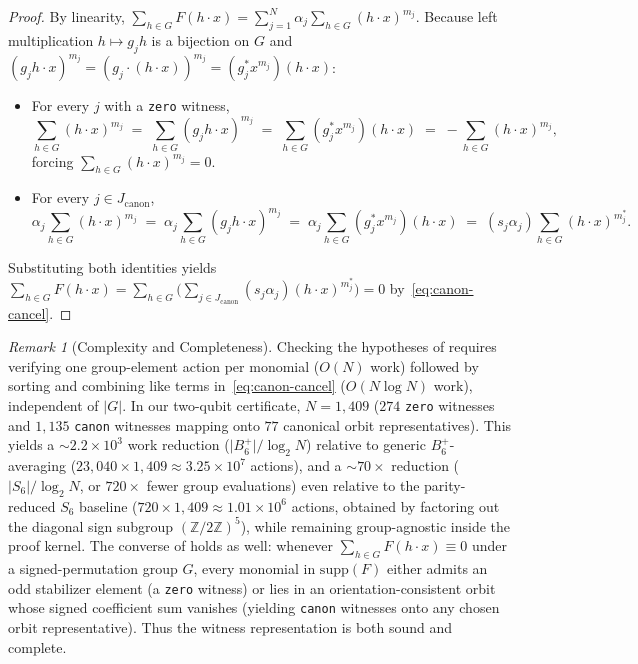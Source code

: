 \documentclass[11pt,a4paper]{article}
\theoremstyle{plain}
\theoremstyle{definition}
\theoremstyle{remark}
\newtheorem{remark}[theorem]{Remark}
\newcommand{\Z}{\mathbb{Z}}
\newcommand{\Bplus}{B_6^+}
\newcommand{\code}[1]{\texttt{\small #1}}
\begin{document}
\begin{proof}
By linearity, $\sum_{h\in G} F(h\cdot x) = \sum_{j=1}^N \alpha_j \sum_{h\in G} (h\cdot x)^{m_j}$. Because left multiplication $h \mapsto g_j h$ is a bijection on $G$ and $(g_j h \cdot x)^{m_j} = (g_j \cdot (h\cdot x))^{m_j} = (g_j^* x^{m_j})(h\cdot x)$:
\begin{itemize}[leftmargin=1.8em, itemsep=2pt]
  \item For every $j$ with a \code{zero} witness,
  \[
    \sum_{h\in G} (h\cdot x)^{m_j}
    \;=\; \sum_{h\in G} (g_j h \cdot x)^{m_j}
    \;=\; \sum_{h\in G} (g_j^* x^{m_j})(h\cdot x)
    \;=\; -\sum_{h\in G} (h\cdot x)^{m_j},
  \]
  forcing $\sum_{h\in G} (h\cdot x)^{m_j} = 0$.
  \item For every $j \in J_{\mathrm{canon}}$,
  \[
    \alpha_j \sum_{h\in G} (h\cdot x)^{m_j}
    \;=\; \alpha_j \sum_{h\in G} (g_j h \cdot x)^{m_j}
    \;=\; \alpha_j \sum_{h\in G} (g_j^* x^{m_j})(h\cdot x)
    \;=\; (s_j \alpha_j) \sum_{h\in G} (h\cdot x)^{m_j^*}.
  \]
\end{itemize}
Substituting both identities yields $\sum_{h\in G} F(h\cdot x) = \sum_{h\in G} \bigl(\sum_{j\in J_{\mathrm{canon}}} (s_j \alpha_j)(h\cdot x)^{m_j^*}\bigr) = 0$ by~\eqref{eq:canon-cancel}.
\end{proof}

\begin{remark}[Complexity and Completeness]
Checking the hypotheses of  requires verifying one group-element action per monomial ($O(N)$ work) followed by sorting and combining like terms in~\eqref{eq:canon-cancel} ($O(N\log N)$ work), independent of $\lvert G\rvert$. In our two-qubit certificate, $N = 1{,}409$ ($274$ \code{zero} witnesses and $1{,}135$ \code{canon} witnesses mapping onto $77$ canonical orbit representatives). This yields a $\sim 2.2\times 10^3$ work reduction ($\lvert\Bplus\rvert/\log_2 N$) relative to generic $\Bplus$-averaging ($23{,}040 \times 1{,}409 \approx 3.25\times 10^7$ actions), and a $\sim 70\times$ reduction ($\lvert S_6\rvert/\log_2 N$, or $720\times$ fewer group evaluations) even relative to the parity-reduced $S_6$ baseline ($720 \times 1{,}409 \approx 1.01\times 10^6$ actions, obtained by factoring out the diagonal sign subgroup $(\Z/2\Z)^5$), while remaining group-agnostic inside the proof kernel. The converse of  holds as well: whenever $\sum_{h\in G} F(h\cdot x) \equiv 0$ under a signed-permutation group $G$, every monomial in $\mathrm{supp}(F)$ either admits an odd stabilizer element (a \code{zero} witness) or lies in an orientation-consistent orbit whose signed coefficient sum vanishes (yielding \code{canon} witnesses onto any chosen orbit representative). Thus the witness representation is both sound and complete.
\end{remark}
\end{document}
